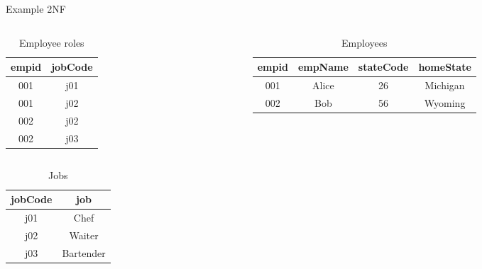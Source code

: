 \documentclass[12pt, aspectratio=169]{beamer}
\begin{document}
\begin{frame}[allowframebreaks]{Example 2NF}
    \begin{columns}[onlytextwidth, T]
        \begin{column}{0.33\linewidth}
            \begin{table}
                \caption{Employee roles}
                    \begin{tabular}{cc}
                      \toprule
                      empid & jobCode \\
                      \midrule
                      001 & j01 \\
                      001 & j02 \\
                      002 & j02 \\
                      002 & j03 \\
                    \bottomrule
                  \end{tabular}
                \end{table}
            \end{column}
        \begin{column}{0.75\linewidth}
            \begin{table}
                \caption{Employees}
                    \begin{tabular}{cccc}
                      \toprule
                      empid & empName & stateCode & homeState \\
                      \midrule
                      001 & Alice & 26 & Michigan \\
                      002 & Bob & 56 & Wyoming \\
                    \bottomrule
                  \end{tabular}
                \end{table}
            \end{column}
    \end{columns}
    \framebreak
    \begin{table}
    \caption{Jobs}
        \begin{tabular}{cc}
          \toprule
            jobCode & job \\
          \midrule
          j01 & Chef \\
          j02 & Waiter \\
          j03 & Bartender \\
        \bottomrule
      \end{tabular}
    \end{table}
\end{frame}
\end{document}
